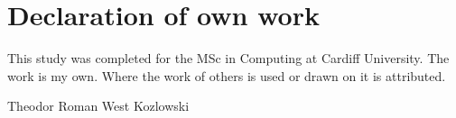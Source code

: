 \thispagestyle{plain}
\section*{Declaration of own work}
This  study  was  completed  for  the  MSc  in  Computing  at Cardiff University. The  work  is  my  own. Where the work of others is used or drawn on it is attributed.

\begin{flushright}
Theodor Roman West Kozlowski
\end{flushright}
